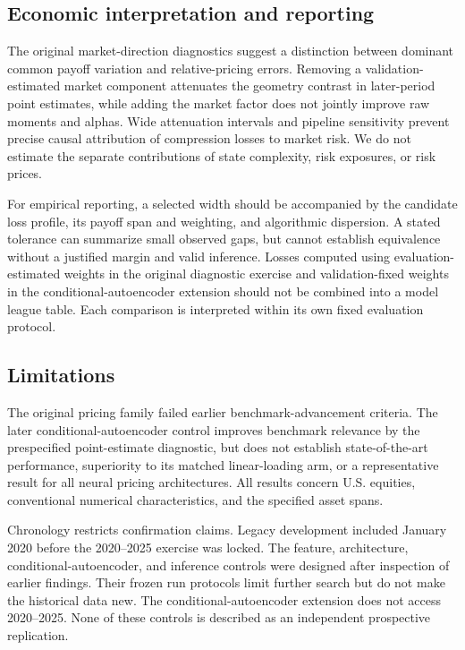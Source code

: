 \subsection{Economic interpretation and reporting}

The original market-direction diagnostics suggest a distinction between dominant common payoff variation and relative-pricing errors. Removing a validation-estimated market component attenuates the geometry contrast in later-period point estimates, while adding the market factor does not jointly improve raw moments and alphas. Wide attenuation intervals and pipeline sensitivity prevent precise causal attribution of compression losses to market risk. We do not estimate the separate contributions of state complexity, risk exposures, or risk prices.

For empirical reporting, a selected width should be accompanied by the candidate loss profile, its payoff span and weighting, and algorithmic dispersion. A stated tolerance can summarize small observed gaps, but cannot establish equivalence without a justified margin and valid inference. Losses computed using evaluation-estimated weights in the original diagnostic exercise and validation-fixed weights in the conditional-autoencoder extension should not be combined into a model league table. Each comparison is interpreted within its own fixed evaluation protocol.

\subsection{Limitations}

The original pricing family failed earlier benchmark-advancement criteria. The later conditional-autoencoder control improves benchmark relevance by the prespecified point-estimate diagnostic, but does not establish state-of-the-art performance, superiority to its matched linear-loading arm, or a representative result for all neural pricing architectures. All results concern U.S. equities, conventional numerical characteristics, and the specified asset spans.

Chronology restricts confirmation claims. Legacy development included January 2020 before the 2020--2025 exercise was locked. The feature, architecture, conditional-autoencoder, and inference controls were designed after inspection of earlier findings. Their frozen run protocols limit further search but do not make the historical data new. The conditional-autoencoder extension does not access 2020--2025. None of these controls is described as an independent prospective replication.

